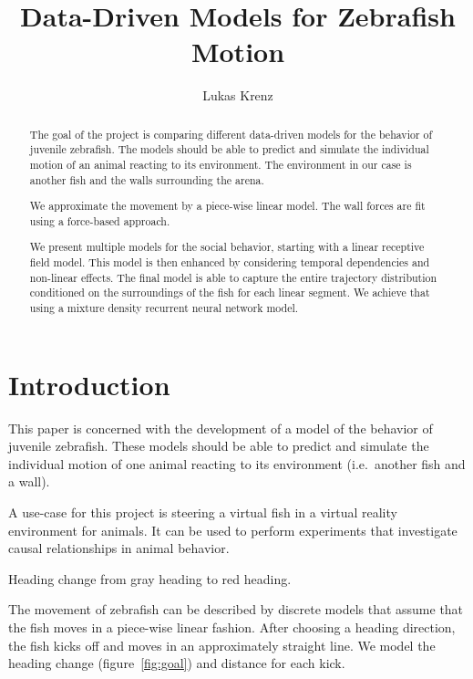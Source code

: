 \documentclass[nobib, a4paper]{tufte-handout}
\title{Data-Driven Models for Zebrafish Motion}
\author[Lukas Krenz]{Lukas Krenz}
\begin{document}
\maketitle%

\begin{abstract}
\noindent
The goal of the project is comparing different data-driven models for the behavior of juvenile zebrafish.
The models should be able to predict and simulate the individual motion of an animal reacting to its environment.
The environment in our case is another fish and the walls surrounding the arena.

We approximate the movement by a piece-wise linear model.
The wall forces are fit using a force-based approach.

We present multiple models for the social behavior, starting with a linear receptive field model.
This model is then enhanced by considering temporal dependencies and non-linear effects.
The final model is able to capture the entire trajectory distribution conditioned on the surroundings of the fish for each linear segment.
We achieve that using a mixture density recurrent neural network model.
\end{abstract}

\section{Introduction}
This paper is concerned with the development of a model of the behavior of juvenile zebrafish.
These models should be able to predict and simulate the individual motion of one animal reacting to its environment (i.e.\ another fish and a wall).

A use-case for this project is steering a virtual fish in a virtual reality environment for animals.
It can be used to perform experiments that investigate causal relationships in animal behavior.

\begin{marginfigure}
    \centering
{} 
\caption{Heading change from gray heading to red heading.}
\label{fig:goal}
\end{marginfigure}
The movement of zebrafish can be described by discrete models that assume that the fish moves in a piece-wise linear fashion.
After choosing a heading direction, the fish kicks off and moves in an approximately straight line.
We model the heading change (figure~\ref{fig:goal}) and distance for each kick.
\end{document}
